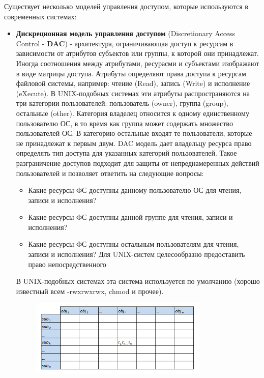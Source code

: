 Существует несколько моделей управления доступом, которые используются в современных системах:
\begin{itemize}
    \item \textbf{Дискреционная модель управления доступом} (Discretionary Access Control - \textbf{DAC}) -
        архитектура, ограничивающая доступ к  ресурсам в зависимости от атрибутов субъектов или
        группы, к которой они принадлежат. Иногда соотношения между атрибутами, ресурасми и субъектами изображают в виде матрицы доступа. Атрибуты определяют права доступа к ресурсам
        файловой системы, например: чтение (Read), запись (Write) и исполнение (eXecute).
        В UNIX-подобных системах эти атрибуты распространяются на три категории пользователей:
        пользователь (owner), группа (group), остальные (other). Категория владелец относится
        к одному единственному пользователю ОС, в то время как группа может содержать множество
        пользователей ОС. В категорию остальные входят те пользователи, которые не принадлежат
        к первым двум.
        DAC модель дает владельцу ресурса право определять тип доступа для указанных категорий
        пользователей. Такое разграничение доступов подходит для защиты от непреднамеренных
        действий пользователей и позволяет ответить на следующие вопросы:
        \begin{itemize}
            \item Какие ресурсы ФС доступны данному пользователю ОС для чтения, записи и исполнения?
            \item Какие ресурсы ФС доступны данной группе для чтения, записи и исполнения?
            \item Какие ресурсы ФС доступны остальным пользователям для чтения, записи и исполнения?
                Для UNIX-систем целесообразно предоставить право непосредственного
        \end{itemize}
        В UNIX-подобных системах эта система используется по умолчанию (хорошо известный всем
        -rwxrwxrwx, chmod и прочее).
        \begin{figure}[h]
    \centering
    \includegraphics[width=0.8\textwidth]{assets/Матрица_доступа.png}

\end{figure}
\end{itemize}
